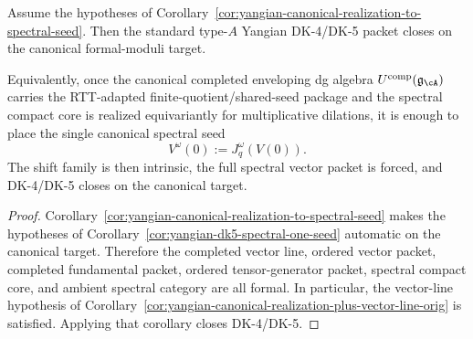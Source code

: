 \iffalse
\begin{corollary}
\label{cor:yangian-canonical-realization-plus-one-seed-orig}
Assume the hypotheses of
Corollary~\ref{cor:yangian-canonical-realization-to-spectral-seed}.
Then the standard type-$A$ Yangian DK-4/DK-5 packet closes on the
canonical formal-moduli target.

Equivalently, once the canonical completed enveloping dg algebra
\(U^{\mathrm{comp}}(\mathfrak{g}_{\cA})\) carries the RTT-adapted
finite-quotient/shared-seed package and the spectral compact core is
realized equivariantly for multiplicative dilations, it is enough to
place the single canonical spectral seed
\[
V^\omega(0):=J_q^\omega(V(0)).
\]
The shift family is then intrinsic, the full spectral vector packet is
forced, and DK-4/DK-5 closes on the canonical target.
\end{corollary}

\begin{proof}
Corollary~\ref{cor:yangian-canonical-realization-to-spectral-seed}
makes the hypotheses of
Corollary~\ref{cor:yangian-dk5-spectral-one-seed} automatic on the
canonical target. Therefore the completed vector line, ordered vector
packet, completed fundamental packet, ordered tensor-generator packet,
spectral compact core, and ambient spectral category are all formal.
In particular, the vector-line hypothesis of
Corollary~\ref{cor:yangian-canonical-realization-plus-vector-line-orig} is
satisfied. Applying that corollary closes DK-4/DK-5.
\end{proof}

